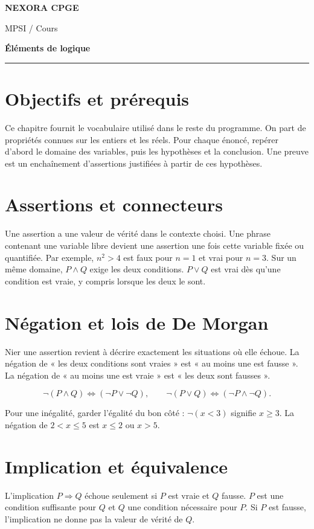 \documentclass[11pt,a4paper]{article}
\begin{document}
{\small\bfseries\color{nexorablue} NEXORA CPGE}\par
{\small MPSI / Cours}\par
{\LARGE\bfseries Éléments de logique}\par
\vspace{0.25em}\hrule\vspace{0.6em}

\section*{Objectifs et prérequis}
Ce chapitre fournit le vocabulaire utilisé dans le reste du programme. On part de propriétés connues sur les entiers et les réels. Pour chaque énoncé, repérer d’abord le domaine des variables, puis les hypothèses et la conclusion. Une preuve est un enchaînement d’assertions justifiées à partir de ces hypothèses.

\section*{Assertions et connecteurs}
Une assertion a une valeur de vérité dans le contexte choisi. Une phrase contenant une variable libre devient une assertion une fois cette variable fixée ou quantifiée. Par exemple, $n^2>4$ est faux pour $n=1$ et vrai pour $n=3$. Sur un même domaine, $P\land Q$ exige les deux conditions. $P\lor Q$ est vrai dès qu’une condition est vraie, y compris lorsque les deux le sont.

\section*{Négation et lois de De Morgan}
Nier une assertion revient à décrire exactement les situations où elle échoue. La négation de « les deux conditions sont vraies » est « au moins une est fausse ». La négation de « au moins une est vraie » est « les deux sont fausses ».

\[ \neg(P\land Q)\iff(\neg P\lor\neg Q),\qquad
\neg(P\lor Q)\iff(\neg P\land\neg Q). \]

Pour une inégalité, garder l’égalité du bon côté : $\neg(x<3)$ signifie $x\ge3$. La négation de $2<x\le5$ est $x\le2$ ou $x>5$.

\section*{Implication et équivalence}
L’implication $P\Rightarrow Q$ échoue seulement si $P$ est vraie et $Q$ fausse. $P$ est une condition suffisante pour $Q$ et $Q$ une condition nécessaire pour $P$. Si $P$ est fausse, l’implication ne donne pas la valeur de vérité de $Q$.
\end{document}
